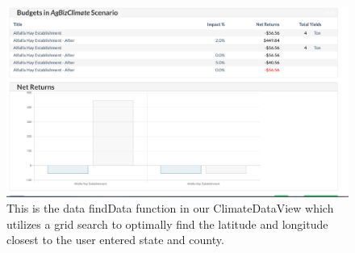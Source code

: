 \documentclass[onecolumn, draftclsnofoot,10pt, compsoc]{article}
\begin{document}
            
        \begin{figure}[h!]
            \includegraphics[width=18cm]{./Images/AgBizBudgets.png}
            \caption{This is the data findData function in our ClimateDataView which utilizes a grid search to optimally find the latitude and longitude closest to the user entered state and county.}
        \end{figure}
\end{document}
